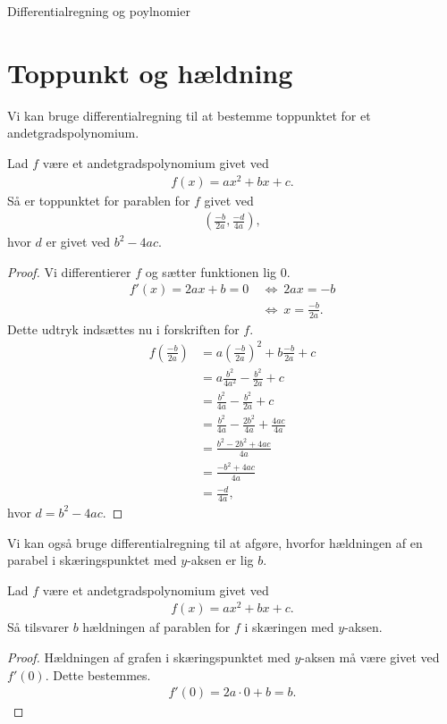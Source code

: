 \begin{center}
\Huge
Differentialregning og poylnomier
\end{center}

\section*{Toppunkt og hældning}

Vi kan bruge differentialregning til at bestemme toppunktet for et andetgradspolynomium.
\begin{setn}[Toppunktsformlen]
	Lad $f$ være et andetgradspolynomium givet ved
	\begin{align*}
		f(x) = ax^2+bx+c.
	\end{align*}
	Så er toppunktet for parablen for $f$ givet ved
	\begin{align*}
		\left(\frac{-b}{2a},\frac{-d}{4a} \right),
	\end{align*}
	hvor $d$ er givet ved $b^2-4ac$.
\end{setn}
\begin{proof}
	Vi differentierer $f$ og sætter funktionen lig $0$. 
	\begin{align*}
		f'(x) = 2ax+b=0 \ &\Leftrightarrow \ 2ax = -b \\
		&\Leftrightarrow \ x = \frac{-b}{2a}.
	\end{align*}
	Dette udtryk indsættes nu i forskriften for $f$.
	\begin{align*}
		f\left( \frac{-b}{2a}\right) &= a\left(\frac{-b}{2a}\right)^2 + b\frac{-b}{2a} + c\\
		&= a \frac{b^2}{4a^2} - \frac{b^2}{2a} + c \\
		&= \frac{b^2}{4a} - \frac{b^2}{2a} + c \\
		&= \frac{b^2}{4a} - \frac{2b^2}{4a} + \frac{4ac}{4a} \\
		&= \frac{b^2 - 2b^2 + 4ac}{4a} \\
		&= \frac{-b^2 + 4ac}{4a} \\
		&= \frac{-d}{4a},
	\end{align*}
	hvor $d=b^2-4ac$.
\end{proof}
Vi kan også bruge differentialregning til at afgøre, hvorfor hældningen af en parabel i skæringspunktet med $y$-aksen er lig $b$.
\begin{setn}
	Lad $f$ være et andetgradspolynomium givet ved
	\begin{align*}
		f(x) = ax^2+bx+c.
	\end{align*}
	Så tilsvarer $b$ hældningen af parablen for $f$ i skæringen med $y$-aksen. 
\end{setn}
\begin{proof}
	Hældningen af grafen i skæringspunktet med $y$-aksen må være givet ved $f'(0)$. Dette bestemmes.
	\begin{align*}
		f'(0) = 2a\cdot 0 + b = b.
	\end{align*}
\end{proof}

